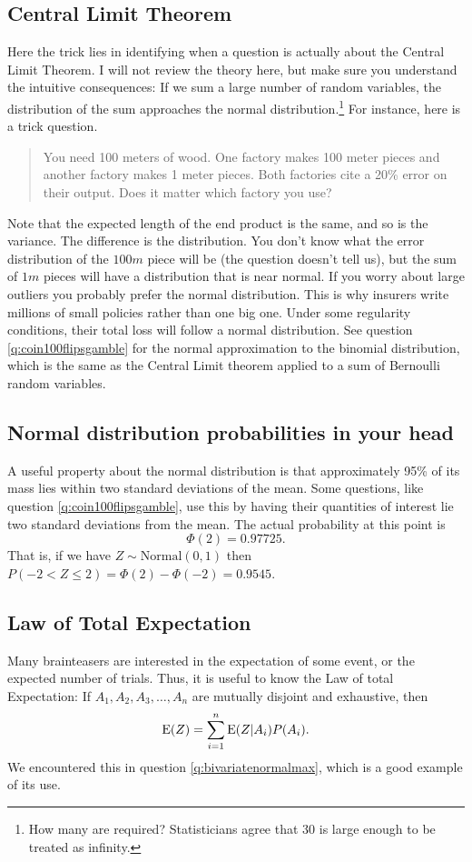 \documentclass[a4paper]{article}
\begin{document}
\subsection{Central Limit Theorem}
Here the trick lies in identifying when a question is actually about the Central Limit Theorem.
I will not review the theory here, but make sure you understand the intuitive consequences:
If we sum a large number of random variables, the distribution of the sum approaches the normal distribution.\footnote{How many are required? Statisticians agree that 30 is large enough to be treated as infinity.}
For instance, here is a trick question.
\begin{quote}
You need 100 meters of wood.
One factory makes 100 meter pieces and another factory makes 1 meter pieces.
Both factories cite a 20\% error on their output.
Does it matter which factory you use?
\end{quote}
Note that the expected length of the end product is the same, and so is the variance.
The difference is the distribution.
You don't know what the error distribution of the $100m$ piece will be (the question doesn't tell us), but the sum of $1m$ pieces will have a distribution that is near normal.
If you worry about large outliers you probably prefer the normal distribution.
This is why insurers write millions of small policies rather than one big one.
Under some regularity conditions, their total loss will follow a normal distribution.
See question \ref{q:coin100flipsgamble} for the normal approximation to the binomial distribution, which is the same as the Central Limit theorem applied to a sum of Bernoulli random variables.


\subsection{Normal distribution probabilities in your head}
A useful property about the normal distribution is that approximately 95\% of its mass lies within two standard deviations of the mean.
Some questions, like question \ref{q:coin100flipsgamble}, use this by having their quantities of interest lie two standard deviations from the mean.
The actual probability at this point is
\[
\Phi(2)
=  0.97725
\text{.}
\]
That is, if we have
$Z \sim \text{Normal}(0,1)$
then
$P(-2 <  Z \leq 2) = \Phi(2)- \Phi(-2) = 0.9545$.


\subsection{Law of Total Expectation}
Many brainteasers are interested in the expectation of some event, or the expected number of trials.
Thus, it is useful to know the Law of total Expectation:
If $ A_1, A_2, A_3, \ldots, A_n$ are mutually disjoint and exhaustive, then
\[
  \operatorname{\mathrm{E}}(Z) = \sum_{i=1}^{n}{
    \operatorname{\mathrm{E}}(Z| A_i)P(A_i)
  }
  \text{.}
\]
We encountered this in question \ref{q:bivariatenormalmax}, which is a good example of its use.
\end{document}
